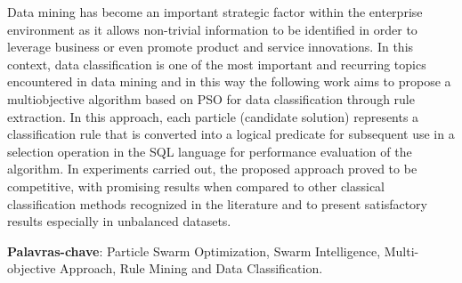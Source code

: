 \begin{resumo}[Abstract]
Data mining has become an important strategic factor within the enterprise environment as it allows non-trivial information to be identified in order to leverage business or even promote product and service innovations. In this context, data classification is one of the most important and recurring topics encountered in data mining and in this way the following work aims to propose a multiobjective algorithm based on PSO for data classification through rule extraction. In this approach, each particle (candidate solution) represents a classification rule that is converted into a logical predicate for subsequent use in a selection operation in the SQL language for performance evaluation of the algorithm. In experiments carried out, the proposed approach proved to be competitive, with promising results when compared to other classical classification methods recognized in the literature and to present satisfactory results especially in unbalanced datasets.

\vspace{1.5ex}

\noindent \textbf{Palavras-chave}: Particle Swarm Optimization, Swarm Intelligence, Multi-objective Approach, Rule Mining and Data Classification. 
\end{resumo}
